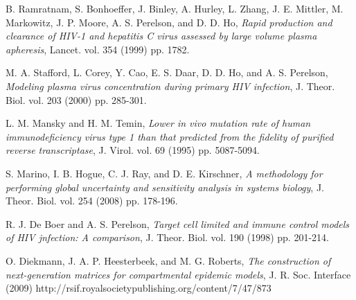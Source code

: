 \documentclass[11pt, oneside]{article}    %
\begin{document}
\begin{thebibliography}{99}
B. Ramratnam, S. Bonhoeffer, J. Binley, A. Hurley, L. Zhang, J. E. Mittler, M. Markowitz, J. P. Moore, A. S. Perelson, and D. D. Ho, {\em Rapid production and clearance of HIV-1 and hepatitis C virus assessed by large volume plasma apheresis}, Lancet. vol. 354 (1999) pp. 1782.

M. A. Stafford, L. Corey, Y. Cao, E. S. Daar, D. D. Ho, and A. S. Perelson,  {\em Modeling plasma virus concentration during primary HIV infection}, J. Theor. Biol. vol. 203 (2000) pp. 285-301.

L. M. Mansky and H. M. Temin, {\em Lower in vivo mutation rate of human immunodeficiency virus type 1 than that predicted from the fidelity of purified reverse transcriptase}, J. Virol. vol. 69 (1995) pp. 5087-5094.

S. Marino, I. B. Hogue, C. J. Ray, and D. E. Kirschner,  {\em A methodology for performing global uncertainty and sensitivity analysis in systems biology}, J. Theor. Biol. vol. 254 (2008) pp. 178-196.

R. J. De Boer and A. S. Perelson, {\em Target cell limited and immune control models of HIV jnfection: A comparison}, J. Theor. Biol. vol. 190 (1998) pp. 201-214.

O. Diekmann, J. A. P. Heesterbeek, and M. G. Roberts, {\em The construction of next-generation matrices for compartmental epidemic models}, J. R. Soc. Interface (2009) http://rsif.royalsocietypublishing.org/content/7/47/873


\end{thebibliography}
\end{document}
